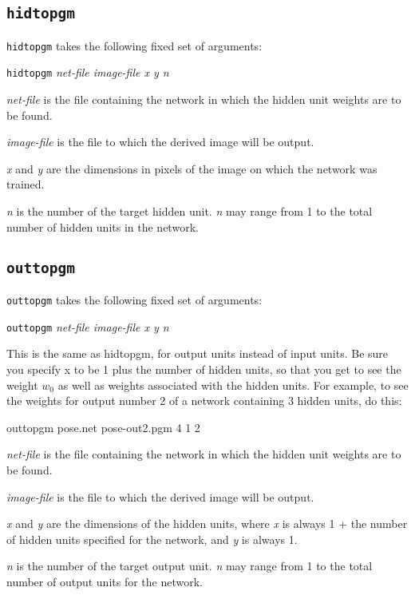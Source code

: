 \subsection {\tt hidtopgm}

{\tt hidtopgm} takes the following fixed set of arguments:

{\tt hidtopgm} {\it net-file image-file x y n}

\begin{description}

\item {\it net-file} is the file containing the network in which
the hidden unit weights are to be found.

\item {\it image-file} is the file to which the derived image will
be output.

\item {\it x} and {\it y} are the dimensions in pixels of the image
on which the network was trained.

\item {\it n} is the number of the target hidden unit. {\it n} may
range from 1 to the total number of hidden units in the network.

\end{description}

\subsection {\tt outtopgm}

{\tt outtopgm} takes the following fixed set of arguments:

{\tt outtopgm} {\it net-file image-file x y n}

\begin{description}
\item This is the same as hidtopgm, for output units instead of input units.
Be sure you specify x to be 1 plus the number of hidden units, so that you get
to see the weight $w_{0}$ as well as weights associated with the hidden units.
For example, to see the weights for output number 2 of a network containing 3
hidden units, do this:

outtopgm pose.net pose-out2.pgm 4 1 2

\item {\it net-file} is the file containing the network in which
the hidden unit weights are to be found.

\item {\it image-file} is the file to which the derived image will
be output.

\item {\it x} and {\it y} are the dimensions of the hidden
units, where {\it x} is always 1 + the number of hidden units
specified
for the network, and {\it y} is always 1.

\item {\it n} is the number of the target output unit. {\it n} may
range from 1 to the total number of output units for the network.

\end{description}


